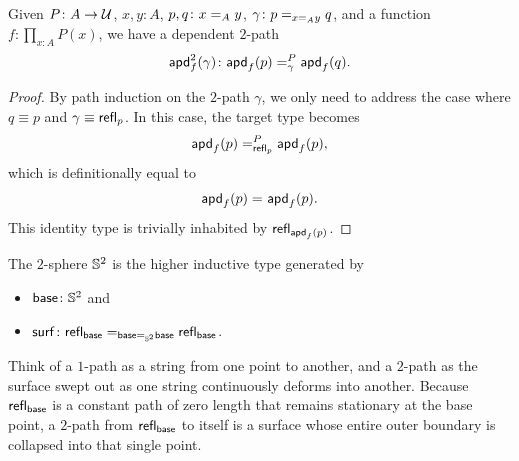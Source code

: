 \begin{lem}
    Given\/ $P\colon A\to\univ$,\/ $x,y\colon A$,\/ $p,q\colon x\eq{A}y$,\/ $\gamma\colon p\eq{x\eq{A}y}q$, and a function\/ $f\colon\prod_{x\colon A}P(x)$, we have a dependent\/ $2$-path
    \[
        \fun{apd}^2_f(\gamma)\colon
            \fun{apd}_f(p)\eqt\gamma P\fun{apd}_f(q).
    \]
\end{lem}

\begin{proof}
    By path induction on the $2$-path $\gamma$, we only need to address the case where $q\equiv p$ and $\gamma\equiv\mathsf{refl}_p$. In this case, the target type becomes
    \[
        \mathsf{apd}_f(p)=_{\mathsf{refl}_p}^{P}\mathsf{apd}_f(p),
    \]
    which is definitionally equal to
    \[
        \mathsf{apd}_f(p)\mathrel{=_{}}\mathsf{apd}_f(p).
    \]
    This identity type is trivially inhabited by $\mathsf{refl}_{\mathsf{apd}_f(p)}$.
\end{proof}

\begin{defn}\label{defn:2-sphere}
    The $2$-sphere $\mathbb S^2$ is the higher inductive type generated by
    \begin{itemize}
        \item $\fun{base}\colon\sphere^2$ and
        \item $\fun{surf}\colon\fun{refl}_{\fun{base}}\eq{\fun{base}\eq{\sphere^2}\fun{base}}\fun{refl}_{\fun{base}}$.
    \end{itemize}
\end{defn}

\begin{rem}\label{rem:2-sphere}
    Think of a $1$-path as a string from one point to another, and a $2$-path as the surface swept out as one string continuously deforms into another. Because $\mathsf{refl}_{\mathsf{base}}$ is a constant path of zero length that remains stationary at the base point, a $2$-path from $\mathsf{refl}_{\mathsf{base}}$ to itself is a surface whose entire outer boundary is collapsed into that single point.
\end{rem}

